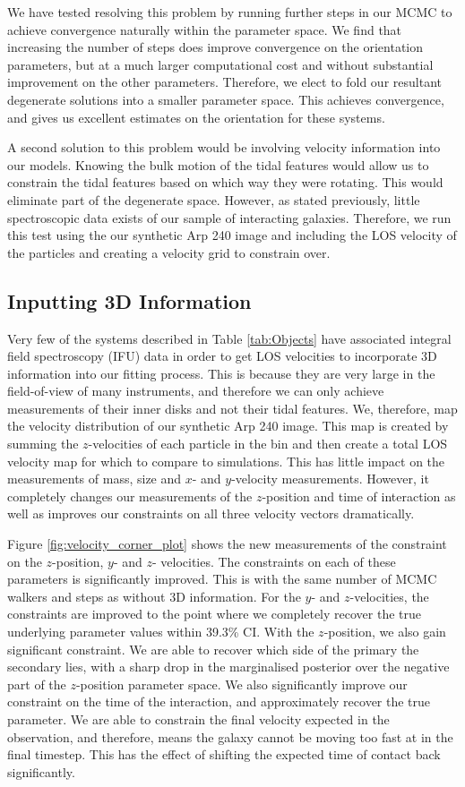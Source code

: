 We have tested resolving this problem by running further steps in our MCMC to achieve convergence naturally within the parameter space. We find that increasing the number of steps does improve convergence on the orientation parameters, but at a much larger computational cost and without substantial improvement on the other parameters. Therefore, we elect to fold our resultant degenerate solutions into a smaller parameter space. This achieves convergence, and gives us excellent estimates on the orientation for these systems.

A second solution to this problem would be involving velocity information into our models. Knowing the bulk motion of the tidal features would allow us to constrain the tidal features based on which way they were rotating. This would eliminate part of the degenerate space. However, as stated previously, little spectroscopic data exists of our sample of interacting galaxies. Therefore, we run this test using the our synthetic Arp 240 image and including the LOS velocity of the particles and creating a velocity grid to constrain over.

\subsection{Inputting 3D Information}
Very few of the systems described in Table \ref{tab:Objects} have associated integral field spectroscopy (IFU) data in order to get LOS velocities to incorporate 3D information into our fitting process. This is because they are very large in the field-of-view of many instruments, and therefore we can only achieve measurements of their inner disks and not their tidal features. We, therefore, map the velocity distribution of our synthetic Arp 240 image. This map is created by summing the $z$-velocities of each particle in the bin and then create a total LOS velocity map for which to compare to simulations. This has little impact on the measurements of mass, size and $x$- and $y$-velocity measurements. However, it completely changes our measurements of the $z$-position and time of interaction as well as improves our constraints on all three velocity vectors dramatically. 

Figure \ref{fig:velocity_corner_plot} shows the new measurements of the constraint on the $z$-position, $y$- and $z$- velocities. The constraints on each of these parameters is significantly improved. This is with the same number of MCMC walkers and steps as without 3D information. For the $y$- and $z$-velocities, the constraints are improved to the point where we completely recover the true underlying parameter values within 39.3\% CI. With the $z$-position, we also gain significant constraint. We are able to recover which side of the primary the secondary lies, with a sharp drop in the marginalised posterior over the negative part of the $z$-position parameter space. We also significantly improve our constraint on the time of the interaction, and approximately recover the true parameter. We are able to constrain the final velocity expected in the observation, and therefore, means the galaxy cannot be moving too fast at in the final timestep. This has the effect of shifting the expected time of contact back significantly.

